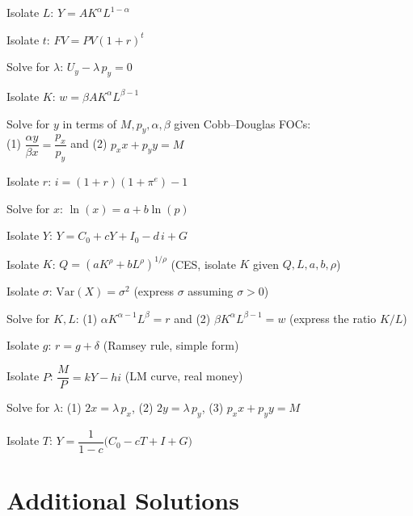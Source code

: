\begin{problems}
  \item Isolate $L$: \quad $Y = A K^{\alpha} L^{1 - \alpha}$
  \item Isolate $t$: \quad $FV = PV (1 + r)^{t}$
  \item Solve for $\lambda$: \quad $U_y - \lambda \, p_y = 0$
  \item Isolate $K$: \quad $w = \beta A K^{\alpha} L^{\beta - 1}$
  \item Solve for $y$ in terms of $M, p_y, \alpha, \beta$ given
        Cobb--Douglas FOCs: \\
        \quad (1) $\dfrac{\alpha y}{\beta x} = \dfrac{p_x}{p_y}$
        \;and\; (2) $p_x x + p_y y = M$
  \item Isolate $r$: \quad $i = (1 + r)(1 + \pi^e) - 1$
  \item Solve for $x$: \quad $\ln(x) = a + b \ln(p)$
  \item Isolate $Y$: \quad $Y = C_0 + c Y + I_0 - d \, i + G$
  \item Isolate $K$: \quad $Q = (a K^{\rho} + b L^{\rho})^{1/\rho}$
        \;(CES, isolate $K$ given $Q, L, a, b, \rho$)
  \item Isolate $\sigma$: \quad $\text{Var}(X) = \sigma^2$
        \;(express $\sigma$ assuming $\sigma > 0$)
  \item Solve for $K, L$: \;(1) $\alpha K^{\alpha - 1} L^{\beta} = r$ and
        (2) $\beta K^{\alpha} L^{\beta - 1} = w$
        \;(express the ratio $K / L$)
  \item Isolate $g$: \quad $r = g + \delta$ \;(Ramsey rule, simple form)
  \item Isolate $P$: \quad $\dfrac{M}{P} = k Y - h i$
        \;(LM curve, real money)
  \item Solve for $\lambda$: \;(1) $2 x = \lambda \, p_x$,
        \;(2) $2 y = \lambda \, p_y$, \;(3) $p_x x + p_y y = M$
  \item Isolate $T$: \quad
        $Y = \dfrac{1}{1 - c} \bigl(C_0 - c T + I + G\bigr)$
\end{problems}

\section{Additional Solutions}

